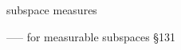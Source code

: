 subspace measures

----- for measurable subspaces \S131






















































































































